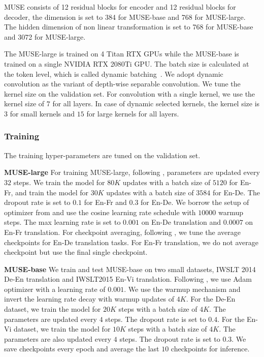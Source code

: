 \documentclass{article} \usepackage{iclr2020_conference,times}
\begin{document}
MUSE consists of 12 residual blocks for encoder and 12 residual blocks for decoder, the dimension is set to 384 for MUSE-base and 768 for MUSE-large. The hidden dimension of non linear transformation is set to 768 for MUSE-base and 3072 for MUSE-large.



The MUSE-large is trained on 4 Titan RTX GPUs while the MUSE-base is trained on a single NVIDIA RTX 2080Ti GPU. The batch size  is calculated at the token level, which is called dynamic batching~\citep{vaswani2017attention}. 
We adopt dynamic convolution as the variant of depth-wise separable convolution. We tune the kernel size on the validation set. For convolution with a single kernel, we use the kernel size of $7$ for all layers. In case of dynamic selected kernels, the kernel size is $3$ for small kernels and $15$ for large kernels for all layers. 


\subsubsection{Training}
The training hyper-parameters are tuned on the validation set. 

\textbf{MUSE-large}
For training MUSE-large, following \citet{ott2018scaling}, parameters are updated every $32$ steps. We train the model for $80K$ updates with a batch size of $5120$ for En-Fr, and train the model for ${30K}$ updates with a batch size of ${3584}$ for En-De. The dropout rate is set to $0.1$ for En-Fr and ${0.3}$ for En-De. We borrow the  setup of optimizer from \citet{wu2019pay} and use the cosine learning rate schedule with ${10000}$ warmup steps. The max learning rate is set to $0.001$ on  En-De translation and ${0.0007}$ on En-Fr translation. For checkpoint averaging, following \citet{wu2019pay}, we tune the average checkpoints for En-De translation tasks. For En-Fr translation, we do not average checkpoint but use the final single checkpoint.


\textbf{MUSE-base}
We train and test MUSE-base on two small datasets, IWSLT 2014 De-En translation and  IWSLT2015 En-Vi translation.  Following \citet{vaswani2017attention}, we use Adam optimizer with a learning rate of $0.001$. We use the warmup mechanism and invert the learning rate decay with warmup updates of $4K$. 
For the De-En dataset, we train the model for $20K$ steps with a batch size of $4K$. The parameters are updated every $4$ steps. The dropout rate is set to $0.4$. For the En-Vi dataset, we train the model for $10K$ steps with a batch size of $4K$. The parameters are  also updated every $4$ steps. The dropout rate is set to $0.3$.
We  save checkpoints every epoch and average the last $10$ checkpoints for inference.
\end{document}
